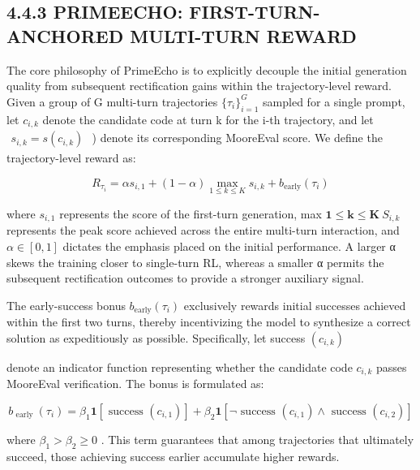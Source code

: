 \documentclass[
  10
]{article}
\begin{document}
\subsection{4.4.3 PRIMEECHO: FIRST-TURN-ANCHORED MULTI-TURN
REWARD}\label{primeecho-first-turn-anchored-multi-turn-reward}

The core philosophy of PrimeEcho is to explicitly decouple the initial
generation quality from subsequent rectification gains within the
trajectory-level reward. Given a group of G multi-turn trajectories
\(\{ \tau _ { i } \} _ { i = 1 } ^ { G }\) sampled for a single prompt,
let \(c _ { i , k }\) denote the candidate code at turn k for the i-th
trajectory, and let
\(\begin{array} { r } { s _ { i , k } = s ( c _ { i , k } ) } \end{array}\)
) denote its corresponding MooreEval score. We define the
trajectory-level reward as:

\[
R _ {\tau_ {i}} = \alpha s _ {i, 1} + (1 - \alpha) \max _ {1 \leq k \leq K} s _ {i, k} + b _ {\mathrm{early}} (\tau_ {i})\tag{9}
\]

where \(s _ { i , 1 }\) represents the score of the first-turn
generation, max
\(\boldsymbol { 1 } \le \boldsymbol { k } \le \boldsymbol { K } \ S _ { i , k }\)
represents the peak score achieved across the entire multi-turn
interaction, and \(\alpha \in [ 0 , 1 ]\) dictates the emphasis placed
on the initial performance. A larger α skews the training closer to
single-turn RL, whereas a smaller α permits the subsequent rectification
outcomes to provide a stronger auxiliary signal.

The early-success bonus
\(b _ { \mathrm { e a r l y } } ( \tau _ { i } )\) exclusively rewards
initial successes achieved within the first two turns, thereby
incentivizing the model to synthesize a correct solution as
expeditiously as possible. Specifically, let success
\(\left( c _ { i , k } \right)\)

denote an indicator function representing whether the candidate code
\(c _ { i , k }\) passes MooreEval verification. The bonus is formulated
as:

\[
b _ {\text { early }} (\tau_ {i}) = \beta_ {1} \mathbf {1} [ \text { success } (c _ {i, 1}) ] + \beta_ {2} \mathbf {1} [ \neg \text { success } (c _ {i, 1}) \land \text { success } (c _ {i, 2}) ]\tag{10}
\]

where \(\beta _ { 1 } > \beta _ { 2 } \ge 0\) . This term guarantees
that among trajectories that ultimately succeed, those achieving success
earlier accumulate higher rewards.
\end{document}

